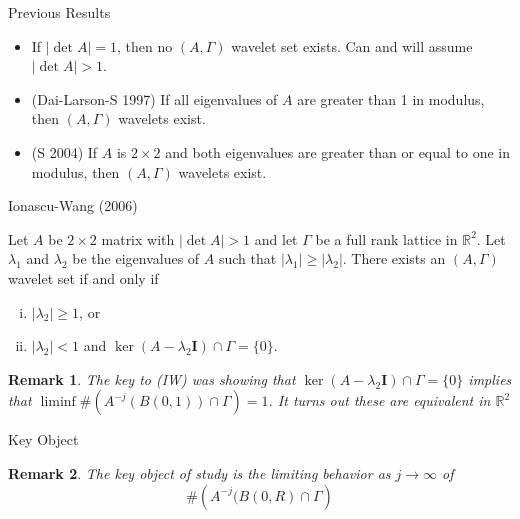 \documentclass{sintefbeamer}
\newcommand{\R}{{\mathbb {R}}}
\newtheorem{remark}{Remark}
\begin{document}
\begin{frame}{Previous Results}

\begin{itemize}
    \item If $|\det A| = 1$, then no $(A, \Gamma)$ wavelet set exists. Can and will assume $|\det A| > 1$.
    
    \pause \item (Dai-Larson-S 1997) If all eigenvalues of $A$ are greater than 1 in modulus, then $(A, \Gamma)$ wavelets exist.
    
    \pause    \item (S 2004) If $A$ is $2\times 2$ and both eigenvalues are greater than or equal to one in modulus, then $(A, \Gamma)$ wavelets exist.
\end{itemize}
\end{frame}

\begin{frame}{Ionascu-Wang (2006)}
    \begin{theorem}
Let $A$ be $2\times 2$ matrix with $\left |\det A \right|>1$ and let $\Gamma$ be a full rank lattice in $\R^2$. Let $\lambda_1$ and $\lambda_2$ be the eigenvalues of $A$ such that $|\lambda_1| \ge |\lambda_2|$. There exists an $(A,\Gamma)$ wavelet set if and only if 
\begin{enumerate}[(i)]
\item $|\lambda_2| \ge 1$, or 
\item $|\lambda_2|<1$ and
$
\ker (A- \lambda_2 \mathbf I) \cap \Gamma = \{0\}.
$
\end{enumerate}
\end{theorem}

\pause 
\begin{remark}
    The key to (IW) was showing that $\ker (A - \lambda_2 \mathbf I) \cap \Gamma = \{0\}$ implies that $\liminf \#\left(A^{-j}\left(B(0, 1)\right) \cap \Gamma\right) = 1$. It turns out these are equivalent in $\R^2$
\end{remark}

        
\end{frame}

\begin{frame}{Key Object}
\begin{remark}
The key object of study is the limiting behavior as $j \to \infty$ of 
$$
\#\left(A^{-j}(B(0, R) \cap \Gamma\right)
$$
\end{remark}
\end{frame}
\end{document}
